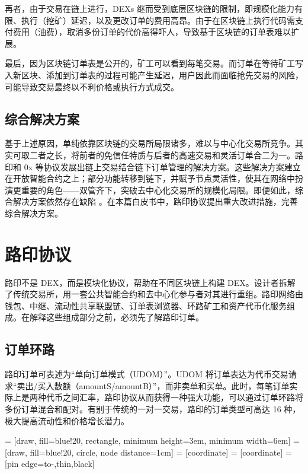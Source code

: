 \documentclass[UTF8,nofonts]{ctexart}%
\makeatletter
\newenvironment{figurehere}
 {\def\@captype{figure}}
 {}
\makeatother
\begin{document}
\begin{multicols}{2}
再者，由于交易在链上进行，DEXs 继而受到底层区块链的限制，即规模化能力有限、执行（挖矿）延迟，以及更改订单的费用高昂。由于在区块链上执行代码需支付费用（油费），取消多份订单的代价高得吓人，导致基于区块链的订单表难以扩展。

最后，因为区块链订单表是公开的，矿工可以看到每笔交易。而订单在等待矿工写入新区块、添加到订单表的过程可能产生延迟，用户因此而面临抢先交易的风险，可能导致交易最终以不利价格或执行方式成交。

\subsection{综合解决方案}
基于上述原因，单纯依靠区块链的交易所局限诸多，难以与中心化交易所竞争。其实可取二者之长，将前者的免信任特质与后者的高速交易和灵活订单合二为一。路印和 0x \cite{warren20170x} 等协议发展出链上交易结合链下订单管理的解决方案。这些解决方案建立在开放智能合约之上；部分功能转移到链下，并赋予节点灵活性，使其在网络中扮演更重要的角色——双管齐下，突破去中心化交易所的规模化局限。即便如此，综合解决方案依然存在缺陷 \cite{costofdecent}。在本篇白皮书中，路印协议提出重大改进措施，完善综合解决方案。


\section{路印协议\label{sec:loopring_protocol}}
路印不是 DEX，而是模块化协议，帮助在不同区块链上构建 DEX。设计者拆解了传统交易所，用一套公共智能合约和去中心化参与者对其进行重组。路印网络由钱包、中继、流动性共享联盟链、订单表浏览器、环路矿工和资产代币化服务组成。在解释这些组成部分之前，必须先了解路印订单。

\subsection{订单环路\label{sec:order_ring}}
路印订单可表述为“单向订单模式（UDOM）”\cite{coinport2014udom}。UDOM 将订单表达为代币交易请求“卖出/买入数额（amountS/amountB）”，而非卖单和买单。此时，每笔订单实际上是两种代币之间汇率，路印协议从而获得一种强大功能，可以通过订单环路将多份订单混合和配对。有别于传统的一对一交易，路印的订单类型可高达 16 种，极大提高流动性和价格增长潜力。

\begin{center}
\begin{figurehere}
\centering
{} = [draw, fill=blue!20, rectangle, 
    minimum height=3em, minimum width=6em]
 = [draw, fill=blue!20, circle, node distance=1cm]
 = [coordinate]
 = [coordinate]
 = [pin edge={to-,thin,black}]


\end{figurehere}
\end{center}
\end{multicols}
\end{document}
